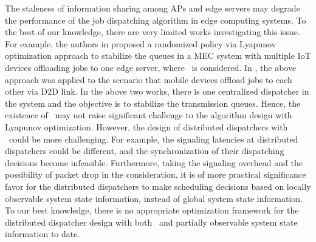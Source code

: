 The staleness of information sharing among APs and edge servers may degrade the performance of the job dispatching algorithm in edge computing systems.
To the best of our knowledge, there are very limited works investigating this issue.
For example, the authors in \cite{JSAC17-LyuX} proposed a randomized policy via Lyapunov optimization approach to stabilize the queues in a MEC system with multiple IoT devices offloading jobs to one edge server, where \brlatency~is considered. 
In \cite{TWC18-LyuX}, the above approach was applied to the scenario that mobile devices offload jobs to each other via D2D link.
In the above two works, there is one centralized dispatcher in the system and the objective is to stabilize the transmission queues.
Hence, the existence of \brlatency~may not raise significant challenge to the algorithm design with Lyapunov optimization.
However, the design of distributed dispatchers with \brlatency~could be more challenging.
For example, the signaling latencies at distributed dispatchers could be different, and the synchronization of their dispatching decisions become infeasible.
Furthermore, taking the signaling overhead and the possibility of packet drop in the consideration, it is of more practical significance favor for the distributed dispatchers to make scheduling decisions based on locally observable system state information, instead of global system state information.
To our best knowledge, there is no appropriate optimization framework for the distributed dispatcher design with both \brlatency~and partially observable system state information to date.

